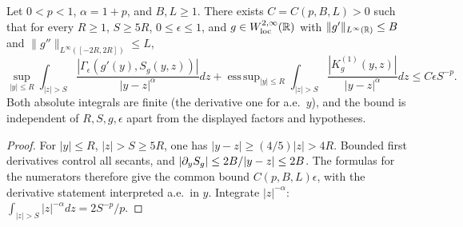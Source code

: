 \begin{lemma}
  \label{lem:c10_Ieps_uniform_tail}
  Let $0<p<1$, $\alpha=1+p$, and $B,L\ge1$. There exists $C=C(p,B,L)>0$ such that for every
  $R\ge1$, $S\ge5R$, $0\le\epsilon\le1$, and $g\in W^{2,\infty}_{\mathrm{loc}}(\mathbb{R})$ with
  $\|g'\|_{L^\infty(\mathbb{R})}\le B$ and $\|g''\|_{L^\infty([-2R,2R])}\le L$,
  \[
    \sup_{|y|\le R}\int_{|z|>S}
       \frac{|\Gamma_\epsilon(g'(y),S_g(y,z))|}{|y-z|^\alpha}dz
    +\mathop{\mathrm{ess\,sup}}_{|y|\le R}\int_{|z|>S}
       \frac{|K_g^{(1)}(y,z)|}{|y-z|^\alpha}dz
       \le C\epsilon S^{-p}.
  \]
  Both absolute integrals are finite (the derivative one for a.e.\ $y$), and the bound is
  independent of $R,S,g,\epsilon$ apart from the displayed factors and hypotheses.
\end{lemma}
\begin{proof}
  For $|y|\le R$, $|z|>S\ge5R$, one has $|y-z|\ge(4/5)|z|>4R$.
  Bounded first derivatives control all secants, and
  $|\partial_yS_g|\le2B/|y-z|\le2B$. The formulas for the numerators therefore give the common bound
  $C(p,B,L)\epsilon$, with the derivative statement interpreted a.e.\ in $y$.
  Integrate $|z|^{-\alpha}$: $\int_{|z|>S}|z|^{-\alpha}dz=2S^{-p}/p$.
\end{proof}

